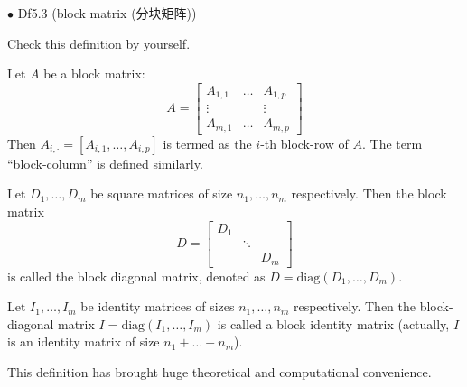 \documentclass{article}
\begin{document}
\begin{Df}{$\bullet$ Df5.3 (block matrix (分块矩阵))}
    \begin{compactenum}
        \item Check this definition by yourself.
        \item Let $A$ be a block matrix:
            $$A = \begin{bmatrix}
                A_{1,1} & \dots & A_{1,p}\\
                \vdots  &       &\vdots\\
                A_{m,1} & \dots & A_{m,p}
            \end{bmatrix}$$
        Then $A_{i,\cdot} = [A_{i,1}, \dots, A_{i,p}]$ is termed as the $i$-th block-row of $A$. The term ``block-column'' is defined similarly.
        \item Let $D_1, \dots, D_m$ be square matrices of size $n_1, \dots, n_m$ respectively. Then the block matrix 
            $$D = \begin{bmatrix}
                D_1 &   &\\
                    & \ddots &\\
                    &   & D_m
            \end{bmatrix}$$
        is called the block diagonal matrix, denoted as $D = \text{diag}(D_1, \dots, D_m)$.
        \item Let $I_1, \dots, I_m$ be identity matrices of sizes $n_1, \dots, n_m$ respectively. Then the block-diagonal matrix $I = \text{diag}(I_1, \dots, I_m)$ is called a block identity matrix (actually, $I$ is an identity matrix of size $n_1+\dots +n_m$).
    \end{compactenum}
\end{Df}

\begin{Rmk}{}
    This definition has brought huge theoretical and computational convenience. 
\end{Rmk}
\end{document}
